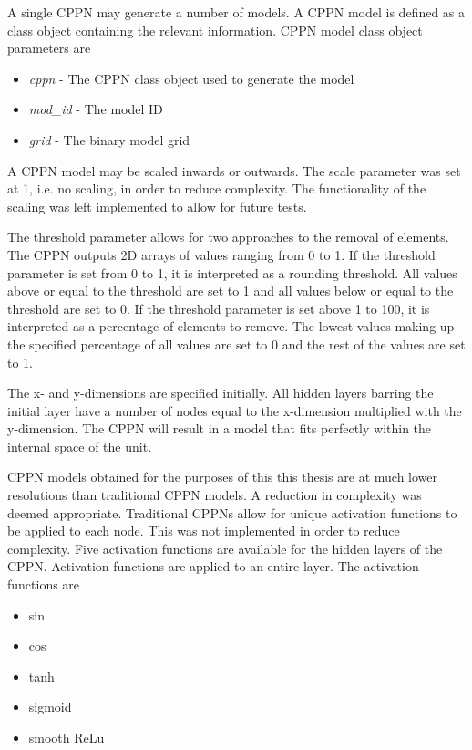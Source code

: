 A single CPPN may generate a number of models. A CPPN model is defined as a class object containing the relevant information. CPPN model class object parameters are

\begin{itemize}
	\item \textit{cppn} - The CPPN class object used to generate the model
	\item \textit{mod\_id} - The model ID
	\item \textit{grid} - The binary model grid
\end{itemize}

A CPPN model may be scaled inwards or outwards. The scale parameter was set at 1, i.e. no scaling, in order to reduce complexity. The functionality of the scaling was left implemented to allow for future tests.

The threshold parameter allows for two approaches to the removal of elements. The CPPN outputs 2D arrays of values ranging from 0 to 1. If the threshold parameter is set from 0 to 1, it is interpreted as a rounding threshold. All values above or equal to the threshold are set to 1 and all values below or equal to the threshold are set to 0. If the threshold parameter is set above 1 to 100, it is interpreted as a percentage of elements to remove. The lowest values making up the specified percentage of all values are set to 0 and the rest of the values are set to 1.

The x- and y-dimensions are specified initially. All hidden layers barring the initial layer have a number of nodes equal to the x-dimension multiplied with the y-dimension. The CPPN will result in a model that fits perfectly within the internal space of the unit.

CPPN models obtained for the purposes of this this thesis are at much lower resolutions than traditional CPPN models. A reduction in complexity was deemed appropriate. Traditional CPPNs allow for unique activation functions to be applied to each node. This was not implemented in order to reduce complexity. Five activation functions are available for the hidden layers of the CPPN. Activation functions are applied to an entire layer. The activation functions are

\begin{itemize}
	\item sin
	\item cos
	\item tanh
	\item sigmoid
	\item smooth ReLu
\end{itemize}

